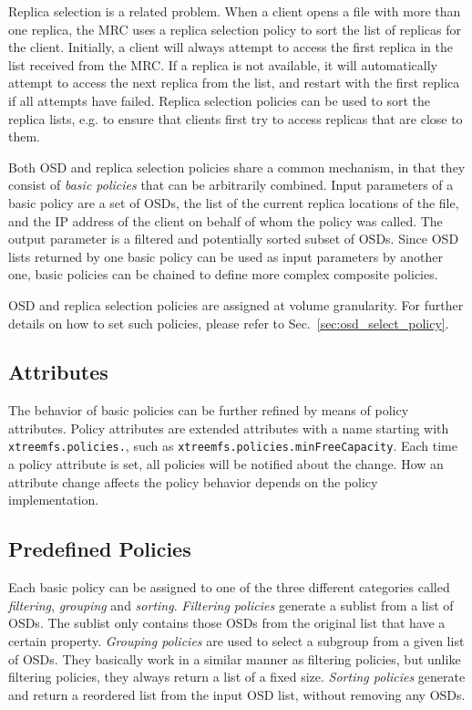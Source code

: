 \documentclass[a4paper,10pt]{book}
\begin{document}
Replica selection is a related problem. When a client opens a file with more than one replica, the MRC uses a replica selection policy to sort the list of replicas for the client. Initially, a client will always attempt to access the first replica in the list received from the MRC. If a replica is not available, it will automatically attempt to access the next replica from the list, and restart with the first replica if all attempts have failed. Replica selection policies can be used to sort the replica lists, e.g. to ensure that clients first try to access replicas that are close to them.

Both OSD and replica selection policies share a common mechanism, in that they consist of \emph{basic policies} that can be arbitrarily combined. Input parameters of a basic policy are a set of OSDs, the list of the current replica locations of the file, and the IP address of the client on behalf of whom the policy was called. The output parameter is a filtered and potentially sorted subset of OSDs. Since OSD lists returned by one basic policy can be used as input parameters by another one, basic policies can be chained to define more complex composite policies.

OSD and replica selection policies are assigned at volume granularity. For further details on how to set such policies, please refer to Sec.\ \ref{sec:osd_select_policy}.

\subsection{Attributes}

The behavior of basic policies can be further refined by means of policy attributes. Policy attributes are extended attributes with a name starting with \texttt{xtreemfs.policies.}, such as \texttt{xtreemfs.policies.minFreeCapacity}. Each time a policy attribute is set, all policies will be notified about the change. How an attribute change affects the policy behavior depends on the policy implementation.

\subsection{Predefined Policies}

Each basic policy can be assigned to one of the three different categories called \emph{filtering}, \emph{grouping} and \emph{sorting}. \emph{Filtering policies} generate a sublist from a list of OSDs. The sublist only contains those OSDs from the original list that have a certain property. \emph{Grouping policies} are used to select a subgroup from a given list of OSDs. They basically work in a similar manner as filtering policies, but unlike filtering policies, they always return a list of a fixed size. \emph{Sorting policies} generate and return a reordered list from the input OSD list, without removing any OSDs.
\end{document}
